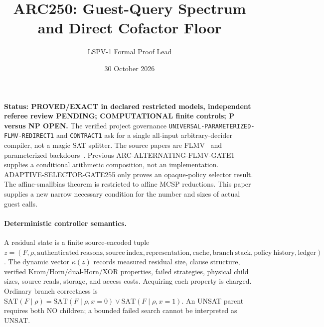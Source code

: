 \documentclass{article}
\title{ARC250: Guest-Query Spectrum and Direct Cofactor Floor}
\author{LSPV-1 Formal Proof Lead}
\date{30 October 2026}
\begin{document}
\maketitle
\noindent \textbf{Status: PROVED/EXACT in declared restricted models, independent referee review PENDING; COMPUTATIONAL finite controls; P versus NP OPEN.}
The verified project governance \texttt{UNIVERSAL-PARAMETERIZED-FLMV-REDIRECT1} and \texttt{CONTRACT1} ask for a single all-input arbitrary-decider compiler, not a magic SAT splitter. The source papers are FLMV~\cite{FLMV} and parameterized backdoors~\cite{DOS}. Previous ARC-ALTERNATING-FLMV-GATE1 supplies a conditional arithmetic composition, not an implementation. ADAPTIVE-SELECTOR-GATE255 only proves an opaque-policy selector result. The affine-smallbias theorem is restricted to affine MCSP reductions. This paper supplies a new narrow necessary condition for the number and sizes of actual guest calls.

\paragraph{Deterministic controller semantics.}
A residual state is a finite source-encoded tuple \(z=(F,\rho,\mathrm{authenticated\ reasons},\mathrm{source\ index},\mathrm{representation},\mathrm{cache},\mathrm{branch\ stack},\mathrm{policy\ history},\mathrm{ledger})\).
The dynamic vector \(\kappa(z)\) records measured residual size, clause structure, verified Krom/Horn/dual-Horn/XOR properties, failed strategies, physical child sizes, source reads, storage, and access costs. Acquiring each property is charged. Ordinary branch correctness is \(\mathrm{SAT}(F\mid\rho)=\mathrm{SAT}(F\mid\rho,x=0)\lor\mathrm{SAT}(F\mid\rho,x=1)\). An UNSAT parent requires both NO children; a bounded failed search cannot be interpreted as UNSAT.
\end{document}
